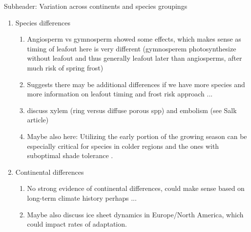 \documentclass{article}
\begin{document}
Subheader: Variation across continents and species groupings
\begin{enumerate}
\item Species differences
\begin{enumerate}
\item Angiosperm vs gymnosperm showed some effects, which makes sense as timing of leafout here is very different (gymnosperem photosynthesize without leafout and thus generally leafout later than angiosperms, after much risk of spring frost)
\item Suggests there may be additional differences if we have more species and more information on leafout timing and frost risk approach ... 
\item discuss xylem (ring versus diffuse porous spp) and embolism  (see Salk article)
\item Maybe also here: Utilizing the early portion of the growing season can be especially critical for species in colder regions \citep{morin07, dantec15} and the ones with suboptimal shade tolerance \citep{richardson09}. 
\end{enumerate}
\item Continental differences
\begin{enumerate}
\item No strong evidence of continental differences, could make sense based on long-term climate history perhaps ... 
\item Maybe also discuss ice sheet dynamics in Europe/North America, which could impact rates of adaptation.
\end{enumerate}
\end{enumerate}
\end{document}
